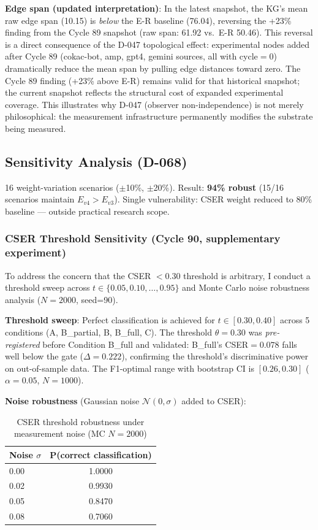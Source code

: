 \documentclass[12pt]{article}
\begin{document}
\noindent\textbf{Edge span (updated interpretation)}: In the latest snapshot, the KG's mean raw edge span (10.15) is \emph{below} the E-R baseline (76.04), reversing the +23\% finding from the Cycle 89 snapshot (raw span: 61.92 vs.\ E-R 50.46). This reversal is a direct consequence of the D-047 topological effect: experimental nodes added after Cycle 89 (cokac-bot, amp, gpt4, gemini sources, all with cycle$=0$) dramatically reduce the mean span by pulling edge distances toward zero. The Cycle 89 finding (+23\% above E-R) remains valid for that historical snapshot; the current snapshot reflects the structural cost of expanded experimental coverage. This illustrates why D-047 (observer non-independence) is not merely philosophical: the measurement infrastructure permanently modifies the substrate being measured.

\subsection{Sensitivity Analysis (D-068)}

16 weight-variation scenarios ($\pm$10\%, $\pm$20\%). Result: \textbf{94\% robust}
(15/16 scenarios maintain $E_{v4} > E_{v3}$). Single vulnerability: CSER weight
reduced to 80\% baseline --- outside practical research scope.

\subsubsection{CSER Threshold Sensitivity (Cycle 90, supplementary experiment)}

To address the concern that the CSER $< 0.30$ threshold is arbitrary, I conduct a
threshold sweep across $t \in \{0.05, 0.10, \ldots, 0.95\}$ and Monte Carlo noise
robustness analysis ($N=2000$, seed=90).

\textbf{Threshold sweep}: Perfect classification is achieved for $t \in [0.30, 0.40]$
across 5 conditions (A, B\_partial, B, B\_full, C). The threshold $\theta = 0.30$ was
\emph{pre-registered} before Condition B\_full and validated: B\_full's CSER$=0.078$
falls well below the gate ($\Delta = 0.222$), confirming the threshold's discriminative
power on out-of-sample data. The F1-optimal range with bootstrap CI is $[0.26, 0.30]$
($\alpha = 0.05$, $N=1000$).

\textbf{Noise robustness} (Gaussian noise $\mathcal{N}(0,\sigma)$ added to CSER):

\begin{table}[h!]\centering\small
\begin{tabular}{lc}
\toprule
Noise $\sigma$ & P(correct classification) \\
\midrule
0.00 & 1.0000 \\
0.02 & 0.9930 \\
0.05 & 0.8470 \\
0.08 & 0.7060 \\
\bottomrule
\end{tabular}
\caption{CSER threshold robustness under measurement noise (MC $N=2000$)}
\end{table}
\end{document}
